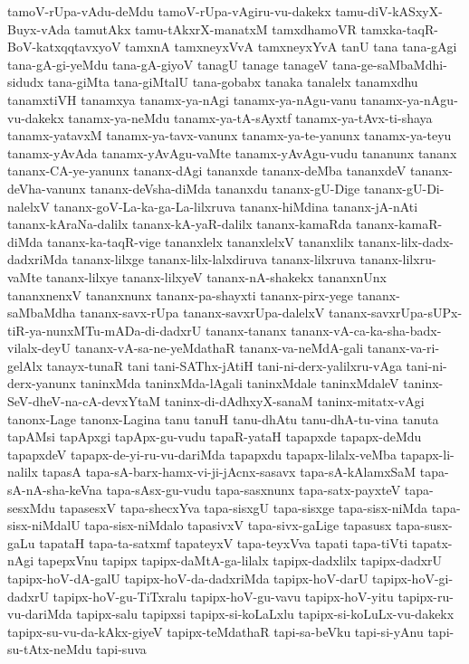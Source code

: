 {tamoV-rUpa-vAdu-deMdu
tamoV-rUpa-vAgiru-vu-dakekx
tamu-diV-kASxyX-Buyx-vAda
tamutAkx
tamu-tAkxrX-manatxM
tamxdhamoVR
tamxka-taqR-BoV-katxqqtavxyoV
tamxnA
tamxneyxVvA
tamxneyxYvA
tanU
tana
tana-gAgi
tana-gA-gi-yeMdu
tana-gA-giyoV
tanagU
tanage
tanageV
tana-ge-saMbaMdhi-sidudx
tana-giMta
tana-giMtalU
tana-gobabx
tanaka
tanalelx
tanamxdhu
tanamxtiVH
tanamxya
tanamx-ya-nAgi
tanamx-ya-nAgu-vanu
tanamx-ya-nAgu-vu-dakekx
tanamx-ya-neMdu
tanamx-ya-tA-sAyxtf
tanamx-ya-tAvx-ti-shaya
tanamx-yatavxM
tanamx-ya-tavx-vanunx
tanamx-ya-te-yanunx
tanamx-ya-teyu
tanamx-yAvAda
tanamx-yAvAgu-vaMte
tanamx-yAvAgu-vudu
tananunx
tananx
tananx-CA-ye-yanunx
tananx-dAgi
tananxde
tananx-deMba
tananxdeV
tananx-deVha-vanunx
tananx-deVsha-diMda
tananxdu
tananx-gU-Dige
tananx-gU-Di-nalelxV
tananx-goV-La-ka-ga-La-lilxruva
tananx-hiMdina
tananx-jA-nAti
tananx-kAraNa-dalilx
tananx-kA-yaR-dalilx
tananx-kamaRda
tananx-kamaR-diMda
tananx-ka-taqR-vige
tananxlelx
tananxlelxV
tananxlilx
tananx-lilx-dadx-dadxriMda
tananx-lilxge
tananx-lilx-lalxdiruva
tananx-lilxruva
tananx-lilxru-vaMte
tananx-lilxye
tananx-lilxyeV
tananx-nA-shakekx
tananxnUnx
tananxnenxV
tananxnunx
tananx-pa-shayxti
tananx-pirx-yege
tananx-saMbaMdha
tananx-savx-rUpa
tananx-savxrUpa-dalelxV
tananx-savxrUpa-sUPx-tiR-ya-nunxMTu-mADa-di-dadxrU
tananx-tananx
tananx-vA-ca-ka-sha-badx-vilalx-deyU
tananx-vA-sa-ne-yeMdathaR
tananx-va-neMdA-gali
tananx-va-ri-gelAlx
tanayx-tunaR
tani
tani-SAThx-jAtiH
tani-ni-derx-yalilxru-vAga
tani-ni-derx-yanunx
taninxMda
taninxMda-lAgali
taninxMdale
taninxMdaleV
taninx-SeV-dheV-na-cA-devxYtaM
taninx-di-dAdhxyX-sanaM
taninx-mitatx-vAgi
tanonx-Lage
tanonx-Lagina
tanu
tanuH
tanu-dhAtu
tanu-dhA-tu-vina
tanuta
tapAMsi
tapApxgi
tapApx-gu-vudu
tapaR-yataH
tapapxde
tapapx-deMdu
tapapxdeV
tapapx-de-yi-ru-vu-dariMda
tapapxdu
tapapx-lilalx-veMba
tapapx-li-nalilx
tapasA
tapa-sA-barx-hamx-vi-ji-jAcnx-sasavx
tapa-sA-kAlamxSaM
tapa-sA-nA-sha-keVna
tapa-sAsx-gu-vudu
tapa-sasxnunx
tapa-satx-payxteV
tapa-sesxMdu
tapasesxV
tapa-shecxYva
tapa-sisxgU
tapa-sisxge
tapa-sisx-niMda
tapa-sisx-niMdalU
tapa-sisx-niMdalo
tapasivxV
tapa-sivx-gaLige
tapasusx
tapa-susx-gaLu
tapataH
tapa-ta-satxmf
tapateyxV
tapa-teyxVva
tapati
tapa-tiVti
tapatx-nAgi
tapepxVnu
tapipx
tapipx-daMtA-ga-lilalx
tapipx-dadxlilx
tapipx-dadxrU
tapipx-hoV-dA-galU
tapipx-hoV-da-dadxriMda
tapipx-hoV-darU
tapipx-hoV-gi-dadxrU
tapipx-hoV-gu-TiTxralu
tapipx-hoV-gu-vavu
tapipx-hoV-yitu
tapipx-ru-vu-dariMda
tapipx-salu
tapipxsi
tapipx-si-koLaLxlu
tapipx-si-koLuLx-vu-dakekx
tapipx-su-vu-da-kAkx-giyeV
tapipx-teMdathaR
tapi-sa-beVku
tapi-si-yAnu
tapi-su-tAtx-neMdu
tapi-suva
}
